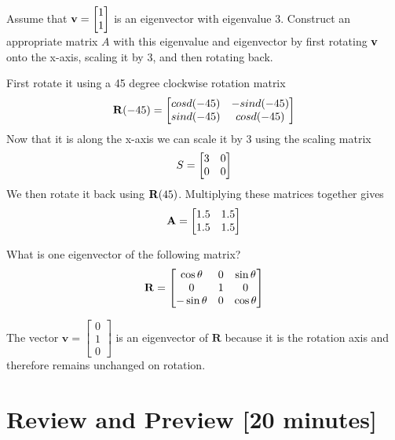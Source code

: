 \begin{prob}
\be
\item Assume that $\mathbf{v} = \begin{bmatrix} 1 \\ 1 \end{bmatrix}$ is an eigenvector with eigenvalue $3$. Construct an appropriate matrix $A$ with this eigenvalue and eigenvector by first rotating $\mathbf{v}$ onto the x-axis, scaling it by $3$, and then rotating back.
\ee
\end{prob}
\begin{sol}
\be
\item First rotate it using a 45 degree clockwise rotation matrix
\begin{align}
\mathbf{R}(-45) = \begin{bmatrix} cosd(-45) & -sind(-45) \\ sind(-45) & cosd(-45)\end{bmatrix}
\end{align}
Now that it is along the x-axis we can scale it by 3 using the scaling matrix 
\begin{align}
S = \begin{bmatrix} 3 & 0 \\ 0 & 0\end{bmatrix}
\end{align}
We then rotate it back using $\mathbf{R}(45)$. Multiplying these matrices together gives
\begin{align}
\mathbf{A} = \begin{bmatrix} 1.5 & 1.5 \\ 1.5 & 1.5\end{bmatrix}
\end{align}
\ee
\end{sol}

\begin{prob}
What is one eigenvector of the following matrix?
\begin{align}
 \mathbf{R} =   \begin{bmatrix}
\cos \theta & 0 & \sin \theta \\
0 & 1 & 0 \\
-\sin \theta & 0 & \cos \theta \\
\end{bmatrix}
\end{align}
\end{prob}
\begin{sol}
The vector $\mathbf{v} = \begin{bmatrix} 0 \\ 1 \\ 0 \end{bmatrix}$ is an eigenvector of $\mathbf{R}$ because it is the rotation axis and therefore remains unchanged on rotation.
\end{sol}

\section{Review and Preview [20 minutes]}

\pagebreak
\shipoutAnswer
